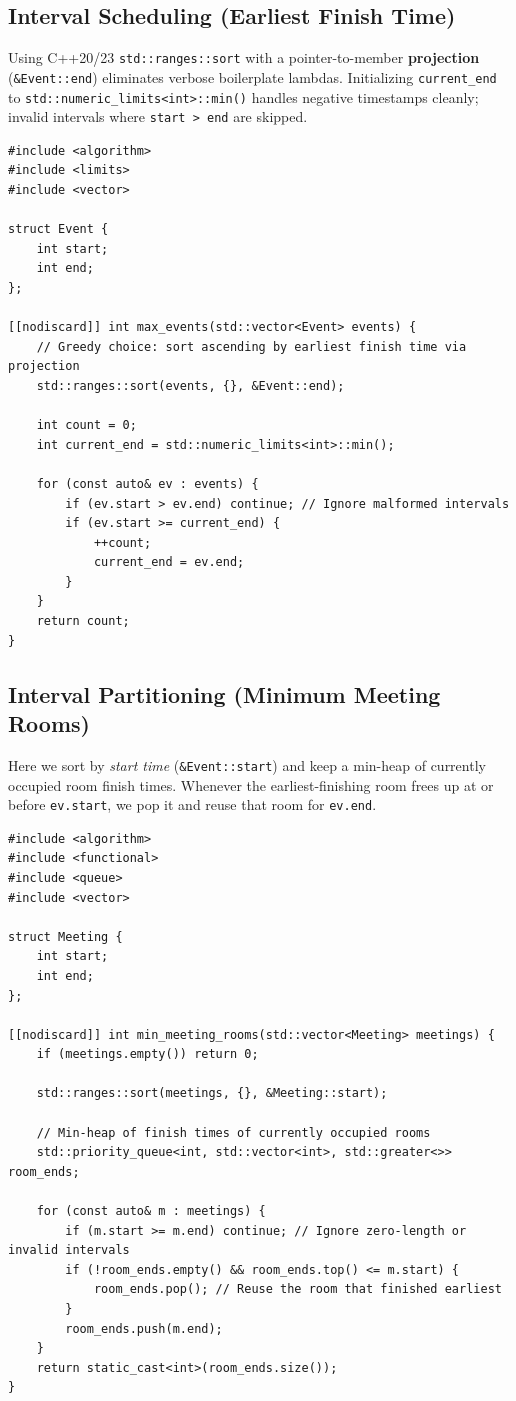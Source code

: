 \documentclass[11pt,a4paper]{article}
\theoremstyle{definition}
\begin{document}
\subsection{Interval Scheduling (Earliest Finish Time)}

Using C++20/23 \texttt{std::ranges::sort} with a pointer-to-member \textbf{projection} (\texttt{\&Event::end}) eliminates verbose boilerplate lambdas. Initializing \texttt{current\_end} to \texttt{std::numeric\_limits<int>::min()} handles negative timestamps cleanly; invalid intervals where \texttt{start > end} are skipped.

\begin{lstlisting}[caption={Interval Scheduling in $O(N \log N)$ time using C++23 projection sorting}]
#include <algorithm>
#include <limits>
#include <vector>

struct Event {
    int start;
    int end;
};

[[nodiscard]] int max_events(std::vector<Event> events) {
    // Greedy choice: sort ascending by earliest finish time via projection
    std::ranges::sort(events, {}, &Event::end);

    int count = 0;
    int current_end = std::numeric_limits<int>::min();

    for (const auto& ev : events) {
        if (ev.start > ev.end) continue; // Ignore malformed intervals
        if (ev.start >= current_end) {
            ++count;
            current_end = ev.end;
        }
    }
    return count;
}
\end{lstlisting}

\subsection{Interval Partitioning (Minimum Meeting Rooms)}

Here we sort by \emph{start time} (\texttt{\&Event::start}) and keep a min-heap of currently occupied room finish times. Whenever the earliest-finishing room frees up at or before \texttt{ev.start}, we pop it and reuse that room for \texttt{ev.end}.

\begin{lstlisting}[caption={Minimum Meeting Rooms in $O(N \log N)$ time and $O(N)$ space}]
#include <algorithm>
#include <functional>
#include <queue>
#include <vector>

struct Meeting {
    int start;
    int end;
};

[[nodiscard]] int min_meeting_rooms(std::vector<Meeting> meetings) {
    if (meetings.empty()) return 0;

    std::ranges::sort(meetings, {}, &Meeting::start);

    // Min-heap of finish times of currently occupied rooms
    std::priority_queue<int, std::vector<int>, std::greater<>> room_ends;

    for (const auto& m : meetings) {
        if (m.start >= m.end) continue; // Ignore zero-length or invalid intervals
        if (!room_ends.empty() && room_ends.top() <= m.start) {
            room_ends.pop(); // Reuse the room that finished earliest
        }
        room_ends.push(m.end);
    }
    return static_cast<int>(room_ends.size());
}
\end{lstlisting}
\end{document}
